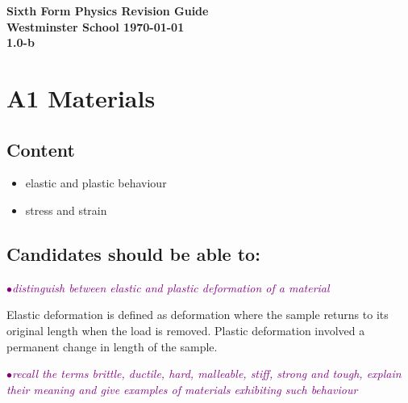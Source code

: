 \documentclass[a4paper,11pt,twoside]{memoir}
\newcommand{\theversion}{1.0-b}
\newcounter{spec}[chapter]
\newcommand{\spec}[1]{\Needspace{5\baselineskip}\textcolor{purple}{$\bullet$\hspace{0.5cm}\textit{#1}}}
\begin{document}
\raggedbottom
\frontmatter
\begin{titlingpage}
\vspace*{\fill}
    \begin{center}\Huge\bfseries Sixth Form Physics Revision Guide \\ \vspace{3cm} \Large Westminster School
    \vfill \today \\ \theversion \end{center}
	\thispagestyle{empty}
\end{titlingpage}

\tableofcontents

\mainmatter
\chapter{A1 Materials}
\setcounter{spec}{0}
\section*{Content}
\begin{itemize}
\item elastic and plastic behaviour
\item stress and strain
\end{itemize}

\section*{Candidates should be able to:}
\spec{distinguish between elastic and plastic deformation of a material}

Elastic deformation is defined as deformation where the sample returns to its original length when the load is removed. Plastic deformation involved a permanent change in length of the sample.

\spec{recall the terms brittle, ductile, hard, malleable, stiff, strong and tough, explain their meaning and give examples of materials exhibiting such behaviour}
\end{document}
